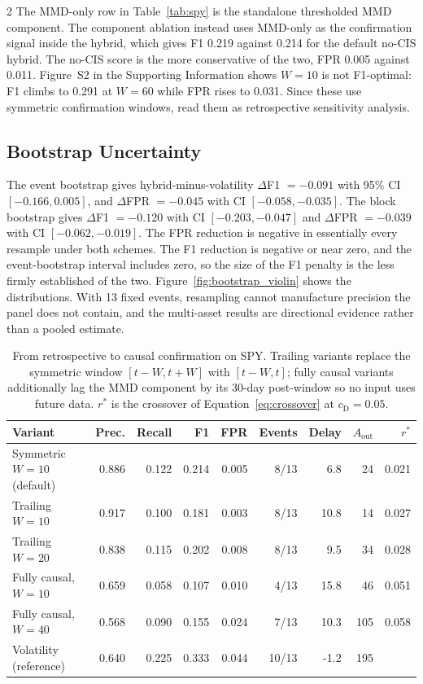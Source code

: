 \documentclass{book}
\makeatletter
\def\my@tag@font{\normalsize}
\let\amsmath@eqref\eqref
\renewcommand\eqref[1]{{\let\my@tag@font\relax\amsmath@eqref{#1}}}
\makeatother
\begin{document}
\begin{multicols}{2}
The MMD-only row in Table~\ref{tab:spy} is the standalone thresholded MMD component. The component ablation instead uses MMD-only as the confirmation signal inside the hybrid, which gives F1 0.219 against 0.214 for the default no-CIS hybrid. The no-CIS score is the more conservative of the two, FPR 0.005 against 0.011. Figure~S2 in the Supporting Information shows $W=10$ is not F1-optimal: F1 climbs to 0.291 at $W=60$ while FPR rises to 0.031. Since these use symmetric confirmation windows, read them as retrospective sensitivity analysis.



\subsection{Bootstrap Uncertainty}
\label{sec:bootstrap}
The event bootstrap gives hybrid-minus-volatility $\Delta$F1 $=-0.091$ with 95\% CI $[-0.166,0.005]$, and $\Delta$FPR $=-0.045$ with CI $[-0.058,-0.035]$. The block bootstrap gives $\Delta$F1 $=-0.120$ with CI $[-0.203,-0.047]$ and $\Delta$FPR $=-0.039$ with CI $[-0.062,-0.019]$. The FPR reduction is negative in essentially every resample under both schemes. The F1 reduction is negative or near zero, and the event-bootstrap interval includes zero, so the size of the F1 penalty is the less firmly established of the two. Figure~\ref{fig:bootstrap_violin} shows the distributions. With 13 fixed events, resampling cannot manufacture precision the panel does not contain, and the multi-asset results are directional evidence rather than a pooled estimate.


\end{multicols}

\begin{table}[!tbp]
\centering
\caption{From retrospective to causal confirmation on SPY. Trailing variants replace the symmetric window $[t-W,t+W]$ with $[t-W,t]$; fully causal variants additionally lag the MMD component by its 30-day post-window so no input uses future data. $r^{*}$ is the crossover of Equation~\eqref{eq:crossover} at $c_{\mathrm{D}}=0.05$.}
\label{tab:causal}
\scriptsize
\begin{tabular}{lrrrrrrrr}
\toprule
Variant & Prec. & Recall & F1 & FPR & Events & Delay & $A_{\mathrm{out}}$ & $r^{*}$\\
\midrule
Symmetric $W=10$ (default) & 0.886 & 0.122 & 0.214 & 0.005 & 8/13 & 6.8 & 24 & 0.021\\
Trailing $W=10$ & 0.917 & 0.100 & 0.181 & 0.003 & 8/13 & 10.8 & 14 & 0.027\\
Trailing $W=20$ & 0.838 & 0.115 & 0.202 & 0.008 & 8/13 & 9.5 & 34 & 0.028\\
Fully causal, $W=10$ & 0.659 & 0.058 & 0.107 & 0.010 & 4/13 & 15.8 & 46 & 0.051\\
Fully causal, $W=40$ & 0.568 & 0.090 & 0.155 & 0.024 & 7/13 & 10.3 & 105 & 0.058\\
Volatility (reference) & 0.640 & 0.225 & 0.333 & 0.044 & 10/13 & -1.2 & 195 & \\
\bottomrule
\end{tabular}
\end{table}
\end{document}
